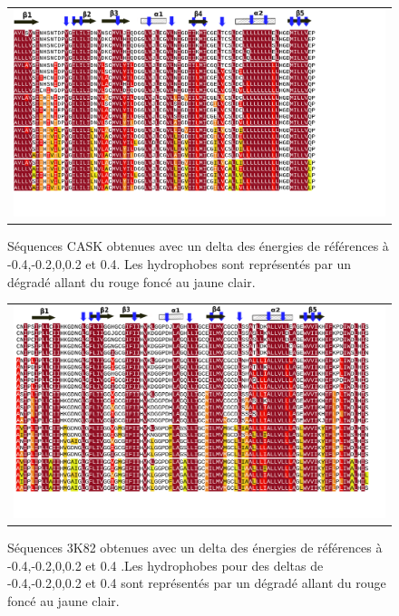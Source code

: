    \clearpage

\begin{landscape}

   \begin{figure}[t]
     \centering
     \begin{tabular}{c}
       \includegraphics[width=20cm]{boost_hydro/alignCASK.png} \\
     \end{tabular}
     \caption{Séquences CASK obtenues avec un delta des énergies de références à -0.4,-0.2,0,0.2 et 0.4. Les hydrophobes sont représentés par un dégradé allant du rouge foncé au jaune clair.}
\label{result:PDZ_seed}
   \end{figure}


   \clearpage

   \begin{figure}[t]
     \centering
     \begin{tabular}{c}
       \includegraphics[width=20cm]{boost_hydro/align3K82.png} \\
     \end{tabular}

     \caption{\small Séquences 3K82 obtenues avec un delta des énergies de références à -0.4,-0.2,0,0.2 et 0.4 .Les hydrophobes pour des deltas de -0.4,-0.2,0,0.2 et 0.4 sont représentés par un dégradé allant du rouge foncé au jaune clair.}

\label{result:PDZ_seed}
   \end{figure}

\end{landscape}


    \clearpage



